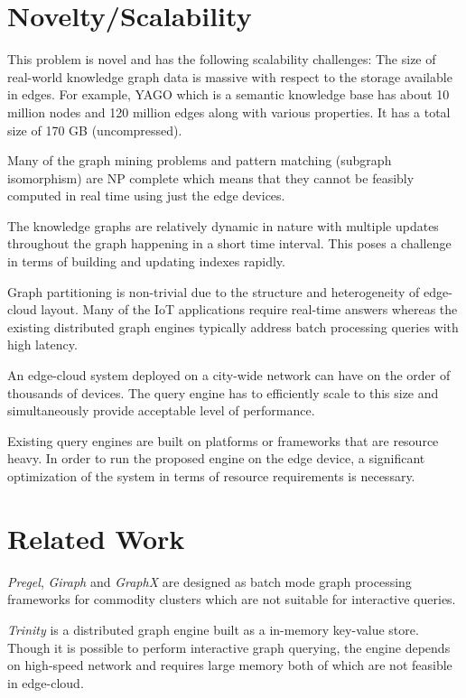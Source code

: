 \documentclass[conference]{IEEEtran}
\begin{document}
\section{Novelty/Scalability}
This problem is novel and has the following scalability challenges: The size of real-world knowledge graph data is massive with respect to the storage available in edges. For example, YAGO\cite{Suchanek:2007:YCS:1242572.1242667} which is a semantic knowledge base has about 10 million nodes and 120 million edges along with various properties. It has a total size of 170 GB (uncompressed).

Many of the graph mining problems and pattern matching (subgraph isomorphism) are NP complete which means that they cannot be feasibly computed in real time using just the edge devices. 

The knowledge graphs are relatively dynamic in nature with multiple updates throughout the graph happening in a short time interval. This poses a challenge in terms of building and updating indexes rapidly.

Graph partitioning is non-trivial due to the structure and heterogeneity of edge-cloud layout. Many of the IoT applications require real-time answers whereas the existing distributed graph engines typically address batch processing queries with high latency.

An edge-cloud system deployed on a city-wide network can have on the order of thousands of devices.  The query engine has to efficiently scale to this size and simultaneously provide acceptable level of performance.

Existing query engines are built on platforms or frameworks that are resource heavy. In order to run the proposed engine on the edge device, a significant optimization of the system in terms of resource requirements is necessary. 

\section{Related Work}

\emph{Pregel}\cite{Malewicz:2010:PSL:1807167.1807184}, \emph{Giraph}\cite{Ching:2015:OTE:2824032.2824077} and \emph{GraphX}\cite{Xin:2013:GRD:2484425.2484427} are designed as batch mode graph processing frameworks for commodity clusters which are not suitable for interactive queries.

\emph{Trinity}\cite{Shao:2013:TDG:2463676.2467799} is a distributed graph engine built as a in-memory key-value store. Though it is possible to perform interactive graph querying, the engine depends on high-speed network and requires large memory both of which are not feasible in edge-cloud.
\end{document}
